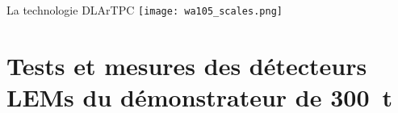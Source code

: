     \begin{frame}{La technologie DLArTPC}
        \centering
       	\vspace{-0.5cm}\hspace{-0.4cm}\texttt{[image: wa105\_scales.png]}
    \end{frame}

    
    \section[Tests des LEMs]{Tests et mesures des détecteurs LEMs du démonstrateur de \SI{300}{\tonne}}

    {
        \begin{specialframe}
            \vspace{2cm}\hspace*{-1.8cm}\parbox[t]{\textwidth}{
                \begin{center}
                    \begin{Huge}
                            \textcolor{pheniics_purple}{\textbf{\insertsection}}
                    \end{Huge}
                \end{center}
            }
        \end{specialframe}
    }


